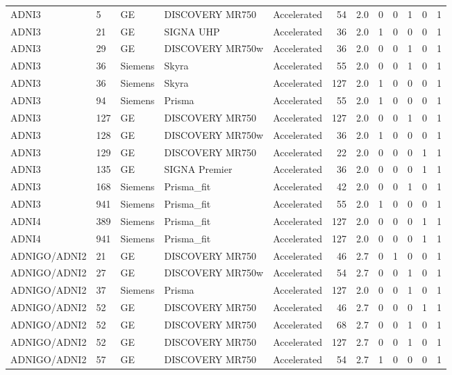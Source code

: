 \documentclass{article}
\begin{document}
\begin{landscape}
\begin{longtable}{lllllrrrrrrr}
ADNI3 & 5 & GE & DISCOVERY MR750 & Accelerated & 54 & 2.0 & 0 & 0 & 1 & 0 & 1 \\
ADNI3 & 21 & GE & SIGNA UHP & Accelerated & 36 & 2.0 & 1 & 0 & 0 & 0 & 1 \\
ADNI3 & 29 & GE & DISCOVERY MR750w & Accelerated & 36 & 2.0 & 0 & 0 & 1 & 0 & 1 \\
ADNI3 & 36 & Siemens & Skyra & Accelerated & 55 & 2.0 & 0 & 0 & 1 & 0 & 1 \\
ADNI3 & 36 & Siemens & Skyra & Accelerated & 127 & 2.0 & 1 & 0 & 0 & 0 & 1 \\
ADNI3 & 94 & Siemens & Prisma & Accelerated & 55 & 2.0 & 1 & 0 & 0 & 0 & 1 \\
ADNI3 & 127 & GE & DISCOVERY MR750 & Accelerated & 127 & 2.0 & 0 & 0 & 1 & 0 & 1 \\
ADNI3 & 128 & GE & DISCOVERY MR750w & Accelerated & 36 & 2.0 & 1 & 0 & 0 & 0 & 1 \\
ADNI3 & 129 & GE & DISCOVERY MR750 & Accelerated & 22 & 2.0 & 0 & 0 & 0 & 1 & 1 \\
ADNI3 & 135 & GE & SIGNA Premier & Accelerated & 36 & 2.0 & 0 & 0 & 0 & 1 & 1 \\
ADNI3 & 168 & Siemens & Prisma\_fit & Accelerated & 42 & 2.0 & 0 & 0 & 1 & 0 & 1 \\
ADNI3 & 941 & Siemens & Prisma\_fit & Accelerated & 55 & 2.0 & 1 & 0 & 0 & 0 & 1 \\
ADNI4 & 389 & Siemens & Prisma\_fit & Accelerated & 127 & 2.0 & 0 & 0 & 0 & 1 & 1 \\
ADNI4 & 941 & Siemens & Prisma\_fit & Accelerated & 127 & 2.0 & 0 & 0 & 0 & 1 & 1 \\
ADNIGO/ADNI2 & 21 & GE & DISCOVERY MR750 & Accelerated & 46 & 2.7 & 0 & 1 & 0 & 0 & 1 \\
ADNIGO/ADNI2 & 27 & GE & DISCOVERY MR750w & Accelerated & 54 & 2.7 & 0 & 0 & 1 & 0 & 1 \\
ADNIGO/ADNI2 & 37 & Siemens & Prisma & Accelerated & 127 & 2.0 & 0 & 0 & 1 & 0 & 1 \\
ADNIGO/ADNI2 & 52 & GE & DISCOVERY MR750 & Accelerated & 46 & 2.7 & 0 & 0 & 0 & 1 & 1 \\
ADNIGO/ADNI2 & 52 & GE & DISCOVERY MR750 & Accelerated & 68 & 2.7 & 0 & 0 & 1 & 0 & 1 \\
ADNIGO/ADNI2 & 52 & GE & DISCOVERY MR750 & Accelerated & 127 & 2.7 & 0 & 0 & 1 & 0 & 1 \\
ADNIGO/ADNI2 & 57 & GE & DISCOVERY MR750 & Accelerated & 54 & 2.7 & 1 & 0 & 0 & 0 & 1 \\

\end{longtable}
\end{landscape}
\end{document}
